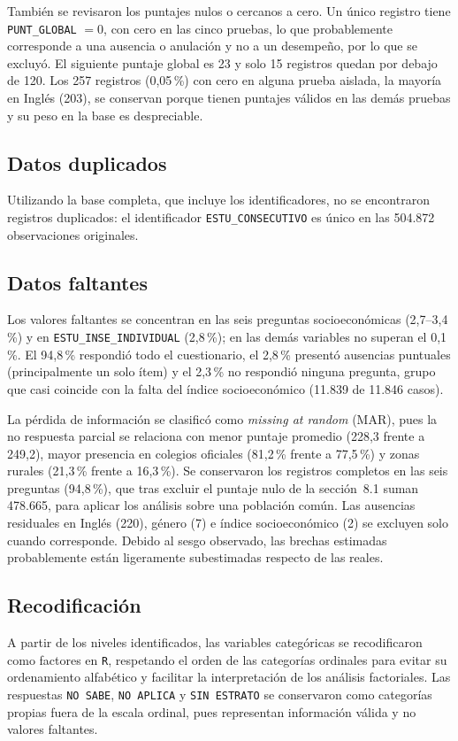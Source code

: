 \documentclass[12pt]{article}
\newcommand{\corr}[1]{\textcolor{azulcorr}{#1}}
\newenvironment{correccion}{\par\color{azulcorr}}{\par}
\begin{document}
\corr{También se revisaron los puntajes nulos o cercanos a cero. Un único registro tiene
\texttt{PUNT\_GLOBAL} $= 0$, con cero en las cinco pruebas, lo que probablemente corresponde a una
ausencia o anulación y no a un desempeño, por lo que se excluyó. El siguiente puntaje global
es 23 y solo 15 registros quedan por debajo de 120. Los 257 registros (0,05\,\%) con cero en
alguna prueba aislada, la mayoría en Inglés (203), se conservan porque tienen puntajes válidos
en las demás pruebas y su peso en la base es despreciable.}

\subsection{Datos duplicados}
Utilizando la base completa, que incluye los identificadores, no se encontraron
registros duplicados: el identificador \texttt{ESTU\_CONSECUTIVO} es único en las
504.872 observaciones originales.

\subsection{Datos faltantes}
\begin{correccion}
Los valores faltantes se concentran en las seis preguntas socioeconómicas (2,7--3,4\,\%)
y en \texttt{ESTU\_INSE\_INDIVIDUAL} (2,8\,\%); en las demás variables no superan el
0,1\,\%. El 94,8\,\% respondió todo el cuestionario, el 2,8\,\% presentó ausencias
puntuales (principalmente un solo ítem) y el 2,3\,\% no respondió ninguna pregunta,
grupo que casi coincide con la falta del índice socioeconómico (11.839 de 11.846 casos).

La pérdida de información se clasificó como \textit{missing at random} (MAR), pues la no
respuesta parcial se relaciona con menor puntaje promedio (228,3 frente a 249,2), mayor
presencia en colegios oficiales (81,2\,\% frente a 77,5\,\%) y zonas rurales (21,3\,\%
frente a 16,3\,\%). Se conservaron los registros completos en las seis preguntas
(94,8\,\%), \corr{que tras excluir el puntaje nulo de la sección~8.1 suman 478.665,} para
aplicar los análisis sobre una población común. Las ausencias residuales
en Inglés (220), género (7) e índice socioeconómico (2) se excluyen solo cuando corresponde.
Debido al sesgo observado, las brechas estimadas \corr{probablemente están ligeramente
subestimadas} respecto de las reales.
\end{correccion}

\subsection{Recodificación}
A partir de los niveles identificados, las variables categóricas se recodificaron como
factores en \texttt{R}, respetando el orden de las categorías ordinales para evitar su
ordenamiento alfabético y facilitar la interpretación de los análisis factoriales.
Las respuestas \texttt{NO SABE}, \texttt{NO APLICA} y \texttt{SIN ESTRATO} se conservaron
como categorías propias fuera de la escala ordinal, pues representan información válida
y no valores faltantes.
\end{document}
